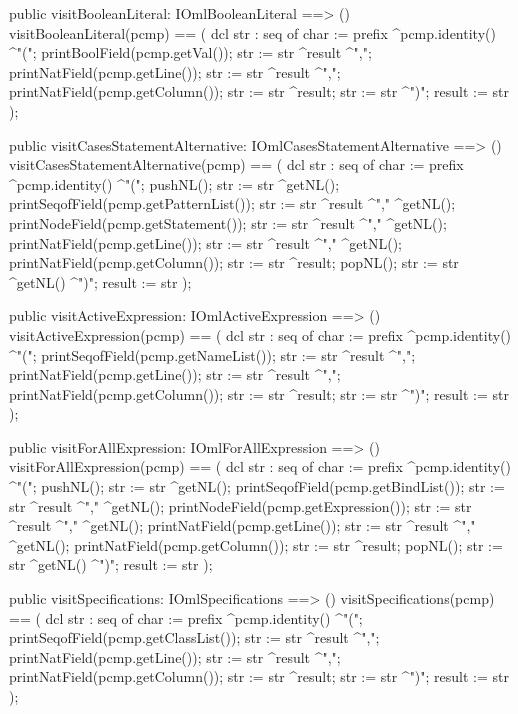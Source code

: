 \begin{vdm_al}
  public visitBooleanLiteral: IOmlBooleanLiteral ==> ()
  visitBooleanLiteral(pcmp) ==
    ( dcl str : seq of char := prefix ^pcmp.identity() ^"(";
      printBoolField(pcmp.getVal());
      str := str ^result ^",";
      printNatField(pcmp.getLine());
      str := str ^result ^",";
      printNatField(pcmp.getColumn());
      str := str ^result;
      str := str ^")";
      result := str );

  public visitCasesStatementAlternative: IOmlCasesStatementAlternative ==> ()
  visitCasesStatementAlternative(pcmp) ==
    ( dcl str : seq of char := prefix ^pcmp.identity() ^"(";
      pushNL();
      str := str ^getNL();
      printSeqofField(pcmp.getPatternList());
      str := str ^result ^"," ^getNL();
      printNodeField(pcmp.getStatement());
      str := str ^result ^"," ^getNL();
      printNatField(pcmp.getLine());
      str := str ^result ^"," ^getNL();
      printNatField(pcmp.getColumn());
      str := str ^result;
      popNL();
      str := str ^getNL() ^")";
      result := str );

  public visitActiveExpression: IOmlActiveExpression ==> ()
  visitActiveExpression(pcmp) ==
    ( dcl str : seq of char := prefix ^pcmp.identity() ^"(";
      printSeqofField(pcmp.getNameList());
      str := str ^result ^",";
      printNatField(pcmp.getLine());
      str := str ^result ^",";
      printNatField(pcmp.getColumn());
      str := str ^result;
      str := str ^")";
      result := str );

  public visitForAllExpression: IOmlForAllExpression ==> ()
  visitForAllExpression(pcmp) ==
    ( dcl str : seq of char := prefix ^pcmp.identity() ^"(";
      pushNL();
      str := str ^getNL();
      printSeqofField(pcmp.getBindList());
      str := str ^result ^"," ^getNL();
      printNodeField(pcmp.getExpression());
      str := str ^result ^"," ^getNL();
      printNatField(pcmp.getLine());
      str := str ^result ^"," ^getNL();
      printNatField(pcmp.getColumn());
      str := str ^result;
      popNL();
      str := str ^getNL() ^")";
      result := str );

  public visitSpecifications: IOmlSpecifications ==> ()
  visitSpecifications(pcmp) ==
    ( dcl str : seq of char := prefix ^pcmp.identity() ^"(";
      printSeqofField(pcmp.getClassList());
      str := str ^result ^",";
      printNatField(pcmp.getLine());
      str := str ^result ^",";
      printNatField(pcmp.getColumn());
      str := str ^result;
      str := str ^")";
      result := str );


\end{vdm_al}
